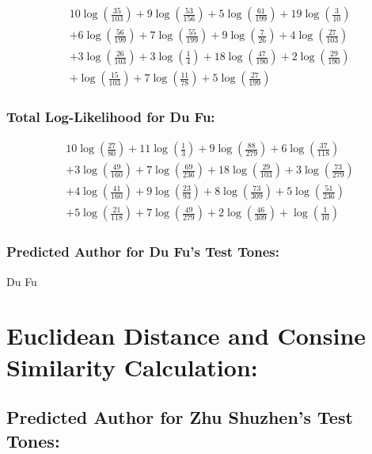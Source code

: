 \documentclass[12pt]{article}
\begin{document}
\begin{align*}
& 10 \log\left(\frac{35}{103}\right) + 9 \log\left(\frac{53}{156}\right) + 5 \log\left(\frac{61}{199}\right) + 19 \log\left(\frac{3}{10}\right) \\
& + 6 \log\left(\frac{56}{199}\right) + 7 \log\left(\frac{55}{199}\right) + 9 \log\left(\frac{7}{26}\right) + 4 \log\left(\frac{27}{103}\right) \\
& + 3 \log\left(\frac{26}{103}\right) + 3 \log\left(\frac{1}{4}\right) + 18 \log\left(\frac{47}{190}\right) + 2 \log\left(\frac{29}{190}\right) \\
& + \log\left(\frac{15}{103}\right) + 7 \log\left(\frac{11}{78}\right) + 5 \log\left(\frac{27}{199}\right)
\end{align*}

\subsubsection*{Total Log-Likelihood for Du Fu:}

\begin{align*}
& 10 \log\left(\frac{27}{80}\right) + 11 \log\left(\frac{1}{3}\right) + 9 \log\left(\frac{88}{279}\right) + 6 \log\left(\frac{37}{118}\right) \\
& + 3 \log\left(\frac{49}{160}\right) + 7 \log\left(\frac{69}{236}\right) + 18 \log\left(\frac{29}{103}\right) + 3 \log\left(\frac{73}{279}\right) \\
& + 4 \log\left(\frac{41}{160}\right) + 9 \log\left(\frac{23}{93}\right) + 8 \log\left(\frac{73}{309}\right) + 5 \log\left(\frac{51}{236}\right) \\
& + 5 \log\left(\frac{21}{118}\right) + 7 \log\left(\frac{49}{279}\right) + 2 \log\left(\frac{46}{309}\right) + \log\left(\frac{1}{10}\right)
\end{align*}

\subsubsection*{Predicted Author for Du Fu's Test Tones: }
Du Fu

\section*{Euclidean Distance and Consine Similarity Calculation: }

\subsection*{Predicted Author for Zhu Shuzhen's Test Tones:}
\end{document}
